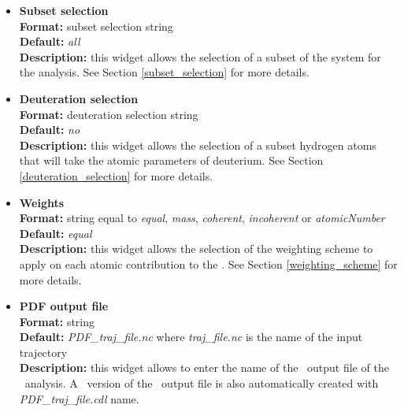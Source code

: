 \documentclass[a4paper,11pt]{report}
\newcommand{\nm}{\textit{nm}}
\begin{document}
\begin{itemize}
For example,
\begin{itemize}
\item \textit{0:10:1} will compute \PDF\ for \textit{r = 0, 1, 2, 3, 4, 5, 6, 7, 8, 9, 10} \nm .
\item \textit{3:7:1.2} will compute \PDF\ for \textit{r = 3, 4.2, 5.4, 6.6} \nm .
\end{itemize}

\item \textbf{Subset selection}\\
\textbf{Format:} subset selection string\\
\textbf{Default:} \textit{all}\\
\textbf{Description:} this widget allows the selection of a subset of the system for the analysis. 
See Section \ref{subset_selection} for more details.

\item \textbf{Deuteration selection}\\
\textbf{Format:} deuteration selection string\\
\textbf{Default:} \textit{no}\\
\textbf{Description:} this widget allows the selection of a subset hydrogen atoms that will take the atomic parameters 
of deuterium. See Section \ref{deuteration_selection} for more details.

\item \textbf{Weights}\\
\textbf{Format:} string equal to \textit{equal}, \textit{mass}, \textit{coherent}, \textit{incoherent} or \textit{atomicNumber}\\
\textbf{Default:} \textit{equal}\\
\textbf{Description:} this widget allows the selection of the weighting scheme to apply on each atomic contribution 
to the \PDF . See Section \ref{weighting_scheme} for more details. 

\item \textbf{PDF output file}\\
\textbf{Format:} string\\
\textbf{Default:} \textit{PDF\_traj\_file.nc} where \textit{traj\_file.nc} is the name of the input trajectory\\
\textbf{Description:} this widget allows to enter the name of the \NetCDF\ output file of the \PDF\ analysis. A \CDL\ 
version of the \NetCDF\ output file is also automatically created with \textit{PDF\_traj\_file.cdl} name.
\end{itemize}
\end{document}
